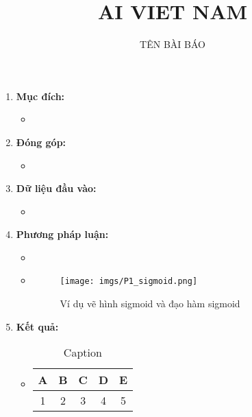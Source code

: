 \documentclass[11pt]{article}
\title{\LARGE AI VIET NAM}
\author{\Huge TÊN BÀI BÁO}
\begin{document}
\maketitle



\begin{enumerate}[\arabic*]
    \item
    \textbf{Mục đích:}
    \begin{itemize}
        \item \blindtext[0]
    \end{itemize}
    
    \item
    \textbf{Đóng góp:}
    \begin{itemize}
        \item \blindtext[0]
    \end{itemize}
    
    \item
    \textbf{Dữ liệu đầu vào:}
    \begin{itemize}
        \item \blindtext[0]
    \end{itemize}
    
    \item
    \textbf{Phương pháp luận:}
    \begin{itemize}
        \item \blindtext[0]
        \item \blindtext[0]
        \begin{figure}[!h]
            \centering
            \texttt{[image: imgs/P1\_sigmoid.png]}
            \caption{Ví dụ vẽ hình sigmoid và đạo hàm sigmoid}
            \label{fig:P1_sig}
        \end{figure}
    \end{itemize}
    
    \item
    \textbf{Kết quả:}
    \begin{itemize}
        \item \blindtext[0]
        \begin{table}[h]
            \begin{center}
            \caption{Caption}\label{tab:2}
            
            \begin{tabular}{|c|c|c|c|c|}
                \hline
                A & B & C & D & E \\
                \hline
                \hline
                1 & 2 & 3 & 4 & 5 \\
                \hline
        

\end{tabular}
\end{center}
\end{table}
\end{itemize}
\end{enumerate}
\end{document}
